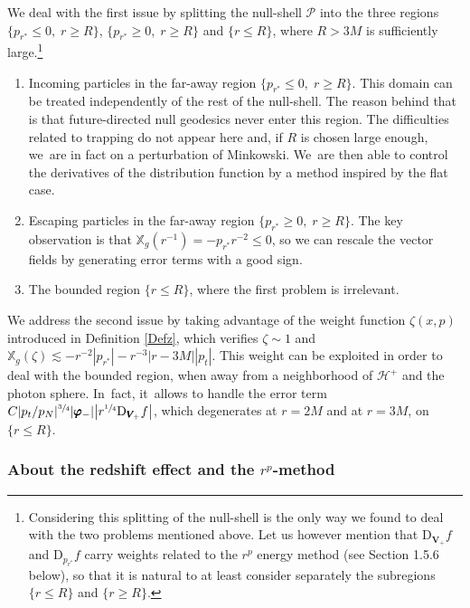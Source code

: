 \documentclass[JEP,XML,SOM,Unicode,published]{cedram}
\theoremstyle{plain}
\theoremstyle{definition}
\newcommand\T{{\mathbb{X}}}
\begin{document}
We deal with the first issue by splitting the null-shell $\mathcal{P}$ into the three regions $\{ p_{r^*} \leq 0, \; r \geq R \}$, $\{ p_{r^*} \geq 0, \; r \geq R \}$ and $\{ r \leq R \}$, where $R > 3M$ is sufficiently large.\footnote{ Considering this splitting of the null-shell is the only way we found to deal with the two problems mentioned above. Let us however mention that $\mathrm{D}_{\pmb{V}_{\!+}}f$ and $ \mathrm{D}_{p_{r^*}}f$ carry weights related to the $r^p$ energy method (see Section 1.5.6 below), so that it is natural to at least consider separately the subregions $\{ r \leq R \}$ and $\{ r \geq R \}$.}
\begin{enumerate}
\item Incoming particles in the far-away region $\{ p_{r^*} \leq 0, \; r \geq R \}$. This domain can be treated independently of the rest of the null-shell. The reason behind that is that future-directed null geodesics never enter this region. The difficulties related to trapping do not appear here and, if $R$ is chosen large enough, we~are in fact on a perturbation of Minkowski. We~are then able to control the derivatives of the distribution function by a method inspired by the flat case.
\item Escaping particles in the far-away region $\{ p_{r^*} \geq 0, \; r \geq R \}$. The key observation is that $\T_g(r^{-1})= -p_{r^*} r^{-2} \leq 0$, so we can rescale the vector fields by generating error terms with a good sign.
\item The bounded region $\{ r \leq R \}$, where the first problem is irrelevant.
\end{enumerate}
We address the second issue by taking advantage of the weight function $\zeta(x,p)$ introduced in Definition \ref{Defz}, which verifies $\zeta \sim 1$ and $\T_g (\zeta) \lesssim -r^{-2}|p_{r^*}|-r^{-3}|r-3M| |p_t|$. This weight can be exploited in order to deal with the bounded region, when away from a neighborhood of $\mathcal{H}^+$ and the photon sphere. In~fact, it~allows to handle the error term $C|p_t/p_N|^{\sfrac{3}{4}}|\pmb{\varphi}_-| \big|r^{\sfrac{1}{4}} \mathrm{D}_{\pmb{V}_{\!+}} f \big|$, which degenerates at $r=2M$ and at $r=3M$, on $\{ r \leq R \}$.

\subsubsection{About the redshift effect and the $r^p$-method}\label{Rqintrored}
\end{document}
